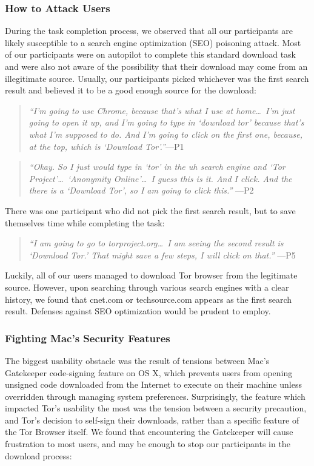 \documentclass[letterpaper,twocolumn,11pt]{article}
\begin{document}
\subsubsection{How to Attack Users}
During the task completion process, we observed that all our participants are likely 
susceptible to a search engine optimization (SEO) poisoning attack. Most of our 
participants  were on autopilot to complete this standard download task and 
were also not aware of the possibility that their download may come from an 
illegitimate source. Usually, our participants picked whichever was the first search
result and believed it to be a good enough source for the download: 

\begin{quote}{\it
``I'm going to use Chrome, because that's what I use at home\ldots\ 
I'm just going to open it up, and I'm going to type in `download tor' because 
that's what I'm supposed to do. And I'm going to click on the first one, because,
at the top, which is `Download Tor'.''}\mbox{---P1}
\end{quote}

\begin{quote}{\it
``Okay. So I just would type in `tor' in the uh search engine and `Tor Project'\ldots\ 
`Anonymity Online'\ldots\ I guess this is it. And I click. And the there is a `Download Tor', 
so I am going to click this.''} \mbox{---P2}
\end{quote}

There was one participant who did not pick the first search result, but to save themselves
time while completing the task: 

\begin{quote}{\it
``I am going to go to torproject.org\ldots\ I am seeing the second result is `Download Tor.'
That might save a few steps, I will click on that.''} \mbox{---P5}
\end{quote}

Luckily, all of our users managed to download Tor browser from the legitimate source. However, 
upon searching through various search engines with a clear history, we found that cnet.com or techsource.com 
 appears as the first search result. Defenses against SEO optimization would be prudent to employ. 

\subsubsection{Fighting Mac's Security Features}
The biggest usability obstacle was the result of tensions between Mac's Gatekeeper 
code-signing feature on OS X, which prevents users from opening unsigned code 
downloaded from the Internet to execute on their machine unless overridden through
managing system preferences. Surprisingly, the feature which impacted Tor's usability
the most was the tension between a security precaution, and Tor's decision to self-sign
their downloads, rather than a specific feature of the Tor Browser itself. We found that 
encountering the Gatekeeper will cause frustration to most users, and may be enough 
to stop our participants in the download process: 
\end{document}
